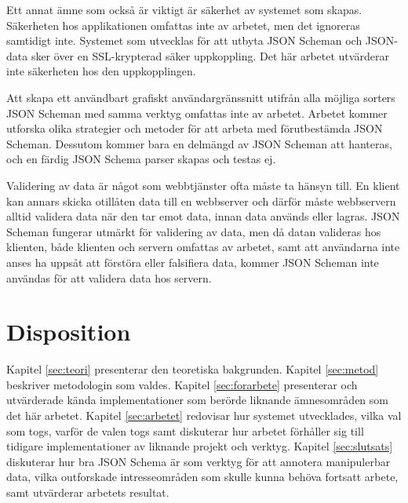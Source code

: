 Ett annat ämne som också är viktigt är säkerhet av systemet som skapas. Säkerheten hos applikationen omfattas inte av arbetet, men det ignoreras samtidigt inte. Systemet som utvecklas för att utbyta JSON Scheman och JSON-data sker över en SSL-krypterad säker uppkoppling. Det här arbetet utvärderar inte säkerheten hos den uppkopplingen.

Att skapa ett användbart grafiskt användargränssnitt utifrån alla möjliga sorters JSON Scheman med samma verktyg omfattas inte av arbetet. Arbetet kommer utforska olika strategier och metoder för att arbeta med förutbestämda JSON Scheman. Dessutom kommer bara en delmängd av JSON Scheman att hanteras, och en färdig JSON Schema parser skapas och testas ej.

Validering av data är något som webbtjänster ofta måste ta hänsyn till. En klient kan annars skicka otillåten data till en webbserver och därför måste webbservern alltid validera data när den tar emot data, innan data används eller lagras. JSON Scheman fungerar utmärkt för validering av data, men då datan valideras hos klienten, både klienten och servern omfattas av arbetet, samt att användarna inte anses ha uppsåt att förstöra eller falsifiera data, kommer JSON Scheman inte användas för att validera data hos servern.

\section{Disposition}
\label{sec:intro:disposition}
Kapitel \ref{sec:teori} presenterar den teoretiska bakgrunden. Kapitel \ref{sec:metod} beskriver metodologin som valdes. Kapitel \ref{sec:forarbete} presenterar och utvärderade kända implementationer som berörde liknande ämnesområden som det här arbetet. Kapitel \ref{sec:arbetet} redovisar hur systemet utvecklades, vilka val som togs, varför de valen togs samt diskuterar hur arbetet förhåller sig till tidigare implementationer av liknande projekt och verktyg. Kapitel \ref{sec:slutsats} diskuterar hur bra JSON Schema är som verktyg för att annotera manipulerbar data, vilka outforskade intresseområden som skulle kunna behöva fortsatt arbete, samt utvärderar arbetets resultat.